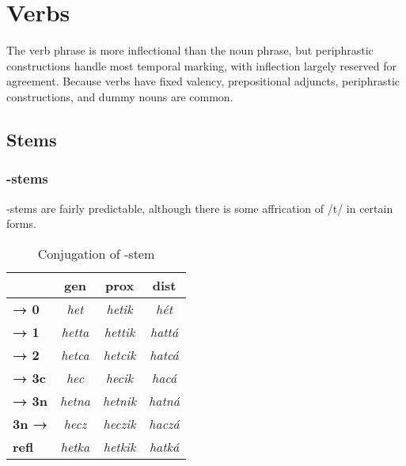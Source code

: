 \setchapterpreamble[u]{\margintoc}
\chapter{Verbs}
The \langname{} verb phrase is more inflectional than the noun phrase, but periphrastic constructions handle most temporal marking, with inflection largely reserved for agreement. Because verbs have fixed valency, prepositional adjuncts, periphrastic constructions, and dummy nouns are common.

\section{Stems}


\subsection{-stems}
-stems are fairly predictable, although there is some affrication of /t/ in certain forms.

\begin{table}[h] \centering
	\begin{tabular}{l|ccc}
		\toprule
		& \sc\bf gen & \sc\bf prox & \sc\bf dist \\ 
		\midrule
		\sc\bf → 0 & \rzc\it het & \rzc\it hetik & \rzc\it hét \\
		\sc\bf → 1 & \rzc\it hetta & \rzc\it hettik & \rzc\it hattá\\
		\sc\bf → 2 & \rzc\it hetca & \rzc\it hetcik & \rzc\it hatcá \\
		\sc\bf → 3c & \rzc\it hec & \rzc\it hecik & \rzc\it hacá \\
		\sc\bf → 3n & \rzc\it  hetna & \rzc\it hetnik & \rzc\it hatná \\
		\sc\bf 3n → & \rzc\it hecz & \rzc\it heczik & \rzc\it haczá\\
		\sc\bf refl & \rzc\it hetka & \rzc\it hetkik & \rzc\it hatká \\
		\bottomrule
	\end{tabular}
	\caption{Conjugation of -stem }
\end{table}

